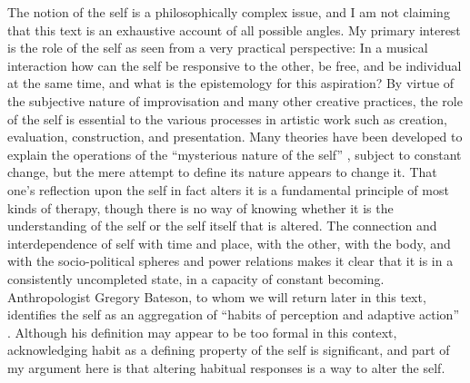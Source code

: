 \documentclass[a4paper]{article}
\begin{document}
The notion of the self is a philosophically complex issue, and I am not claiming that this text is an exhaustive account of all possible angles. My primary interest is the role of the self as seen from a very practical perspective: In a musical interaction how can the self  be responsive to the other, be free, and be individual at the same time, and what is the epistemology for this aspiration?  By virtue of the subjective nature of improvisation and many other creative practices, the role of the self is essential to the various processes in artistic work such as creation, evaluation, construction, and presentation. Many theories have been developed to explain the operations of the ``mysterious nature of the self''  \autocite[][167]{griffiths10}, subject to constant change, but the mere attempt to define its nature appears to change it. That one’s reflection upon the self in fact alters it is a fundamental principle of most kinds of therapy, though there is no way of knowing whether it is the understanding of the self or the self itself that is altered. The connection and interdependence of self with time and place, with the other, with the body, and with the socio-political spheres and power relations makes it clear that it is in a consistently uncompleted state, in a capacity of constant becoming. Anthropologist Gregory Bateson, to whom we will return later in this text, identifies the self as an aggregation of ``habits of perception and adaptive action'' \autocite[242]{bateson72:steps}. Although his definition may appear to be too formal in this context, acknowledging habit as a defining property of the self is significant, and part of my argument here is that altering habitual responses is a way to alter the self. 

\end{document}
